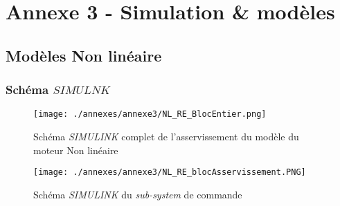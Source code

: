 \chapter*{Annexe 3 - Simulation \& modèles}

\section*{Modèles Non linéaire}\label{annex:modl_NL_SIMULINK}
\subsection*{Schéma $SIMULNK$}
\begin{figure}[!ht]
\centering
\texttt{[image: ./annexes/annexe3/NL\_RE\_BlocEntier.png]}
\caption{Schéma \emph{SIMULINK} complet de l'asservissement du modèle du moteur Non linéaire\label{fig:SIMULINK_NL_schema}}
\end{figure}

\begin{figure}[!ht]
\centering
\texttt{[image: ./annexes/annexe3/NL\_RE\_blocAsservissement.PNG]}
\caption{Schéma \emph{SIMULINK} du \emph{sub-system} de commande\label{fig:SIMULINK_NL_subsystem_schema}}
\end{figure}

